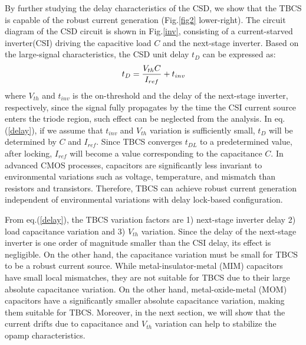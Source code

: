 \documentclass[paper]{ieice}
\begin{document}
By further studying the delay characteristics of the CSD, we show that the TBCS is capable of the robust current generation (Fig.\ref{fig2} lower-right).
The circuit diagram of the CSD circuit is shown in Fig.\ref{inv}, consisting of a current-starved inverter(CSI)\cite{mroszczyk2014tunable} driving the capacitive load $C$ and the next-stage inverter. Based on the large-signal characteristics, the CSD unit delay $t_D$ can be expressed as: 
\begin{eqnarray}
    \centering
    t_D = \frac{V_{th}C}{I_{ref}}+t_{inv}
    \label{delay}
\end{eqnarray}
where $V_{th}$ and $t_{inv}$ is the on-threshold and the delay of the next-stage inverter, respectively, since the signal fully propagates by the time the CSI current source enters the triode region, such effect can be neglected from the analysis. In eq.(\ref{delay}), if we assume that $t_{inv}$ and $V_{th}$ variation is sufficiently small, $t_D$ will be determined by $C$ and $I_{ref}$. 
Since TBCS converges $t_{DL}$ to a predetermined value, after locking, $I_{ref}$ will become a value corresponding to the capacitance $C$. In advanced CMOS processes, capacitors are significantly less invariant to environmental variations such as voltage, temperature, and mismatch than resistors and transistors. Therefore, TBCS can achieve robust current generation independent of environmental variations with delay lock-based configuration.

From eq.(\ref{delay}), the TBCS variation factors are 1) next-stage inverter delay 2) load capacitance variation and 3) $V_{th}$ variation.
Since the delay of the next-stage inverter is one order of magnitude smaller than the CSI delay, its effect is negligible. On the other hand, the capacitance variation must be small for TBCS to be a robust current source. While metal-insulator-metal (MIM) capacitors have small local mismatches, they are not suitable for TBCS due to their large absolute capacitance variation. On the other hand, metal-oxide-metal (MOM) capacitors have a significantly smaller absolute capacitance variation, making them suitable for TBCS. Moreover, in the next section, we will show that the current drifts due to capacitance and $V_{th}$ variation can help to stabilize the opamp characteristics.
\end{document}
